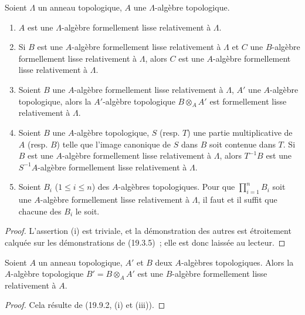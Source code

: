 \begin{proposition}[19.9.2]
\label{0.19.9.2-fr}
Soient $\Lambda$ un anneau topologique, $A$ une $\Lambda$-algèbre topologique.
\begin{enumerate}
  \item[(i)] $A$ est une $\Lambda$-algèbre formellement lisse relativement à
  $\Lambda$.
  \item[(ii)] Si $B$ est une $A$-algèbre formellement lisse relativement à
  $\Lambda$ et $C$ une $B$-algèbre formellement lisse relativement à
  $\Lambda$, alors $C$ est une $A$-algèbre formellement lisse relativement à
  $\Lambda$.
  \item[(iii)] Soient $B$ une $A$-algèbre formellement lisse relativement à
  $\Lambda$, $A'$ une $A$-algèbre topologique, alors la $A'$-algèbre
  topologique $B\otimes_A A'$ est formellement lisse relativement à $\Lambda$.
  \item[(iv)] Soient $B$ une $A$-algèbre topologique, $S$ (resp. $T$) une
  partie multiplicative de $A$ (resp. $B$) telle que l'image canonique de $S$
  dans $B$ soit contenue dans $T$. Si $B$ est une $A$-algèbre formellement
  lisse relativement à $\Lambda$, alors $T^{-1}B$ est une $S^{-1}A$-algèbre
  formellement lisse relativement à $\Lambda$.
  \item[(v)] Soient $B_i$ ($1\leq i\leq n$) des $A$-algèbres topologiques.
  Pour que $\prod_{i=1}^n B_i$ soit une $A$-algèbre formellement lisse
  relativement à $\Lambda$, il faut et il suffit que chacune des $B_i$ le
  soit.
\end{enumerate}
\end{proposition}

\begin{proof}
L'assertion (i) est triviale, et la démonstration des autres est étroitement
calquée sur les démonstrations de (19.3.5)~; elle est donc laissée au lecteur.
\end{proof}

\begin{corollary}[19.9.3]
\label{0.19.9.3-fr}
Soient $A$ un anneau topologique, $A'$ et $B$ deux $A$-algèbres topologiques.
Alors la $A$-algèbre topologique $B'=B\otimes_A A'$ est une $B$-algèbre
formellement lisse relativement à $A$.
\end{corollary}

\begin{proof}
Cela résulte de (19.9.2, (i) et (iii)).
\end{proof}

